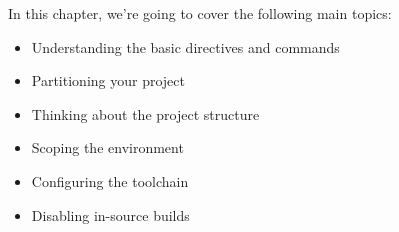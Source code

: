 In this chapter, we’re going to cover the following main topics:

\begin{itemize}
\item
Understanding the basic directives and commands

\item
Partitioning your project

\item
Thinking about the project structure

\item
Scoping the environment

\item
Configuring the toolchain

\item
Disabling in-source builds
\end{itemize}
































